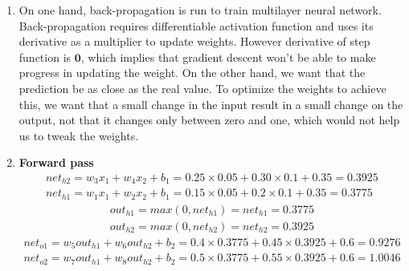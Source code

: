 \documentclass[12pt]{article}
\begin{document}
\begin{enumerate}
\item On one hand, back-propagation is run to train multilayer neural network. Back-propagation requires differentiable activation function and uses its derivative as a multiplier to update weights. However derivative of  step function is $\mathbf{0}$, which implies that gradient descent won't be able to make progress in updating the weight. On the other hand, we want that the prediction be as close as the real value. To optimize the weights to achieve this, we want that a small change in the input result in a small change on the output, not that it changes only between zero and one, which would not help us to tweak the weights.
\item 
\textbf{Forward pass}
\begin{gather*}
net_{h2} = w_{3}x_{1} + w_4x_2 + b_1 = 0.25 \times 0.05 + 0.30 \times 0.1 + 0.35 = 0.3925\\
net_{h1} = w_{1}x_{1} + w_2x_2 + b_1 = 0.15 \times 0.05 + 0.2 \times 0.1 + 0.35 = 0.3775
\end{gather*}
\begin{gather*}
out_{h1} = max(0, net_{h1}) = net_{h1} = 0.3775\\
out_{h2} = max(0, net_{h2}) = net_{h2} = 0.3925
\end{gather*}
\begin{gather*}
net_{o1} = w_5out_{h1} + w_6out_{h2} + b_2 = 0.4 \times 0.3775 + 0.45 \times 0.3925 + 0.6 = 0.9276\\
net_{o2} = w_7out_{h1} + w_8out_{h2} + b_2 = 0.5 \times 0.3775 + 0.55 \times 0.3925 + 0.6 =  1.0046
\end{gather*}


\end{enumerate}
\end{document}
